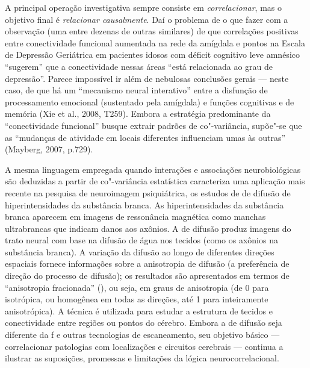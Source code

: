 A principal operação investigativa sempre consiste em
\emph{correlacionar}, mas o objetivo final é \emph{relacionar
causalmente}. Daí o problema de o que fazer com a observação (uma entre
dezenas de outras similares) de que correlações positivas entre
conectividade funcional aumentada na rede da amígdala e pontos na Escala
de Depressão Geriátrica em pacientes idosos com déficit cognitivo leve
amnésico ``sugerem'' que a conectividade nessas áreas ``está relacionada
ao grau de depressão''. Parece impossível ir além de nebulosas
conclusões gerais --- neste caso, de que há um ``mecanismo neural
interativo'' entre a disfunção de processamento emocional (sustentado
pela amígdala) e funções cognitivas e de memória (Xie et al., 2008,
T259). Embora a estratégia predominante da ``conectividade funcional''
busque extrair padrões de co"-variância, supõe"-se que as ``mudanças de
atividade em locais diferentes influenciam umas às outras'' (Mayberg,
2007, p.729).

A mesma linguagem empregada quando interações e associações
neurobiológicas são deduzidas a partir de co"-variância estatística
caracteriza uma aplicação mais recente na pesquisa de neuroimagem
psiquiátrica, os estudos de  de difusão de hiperintensidades da
substância branca. As hiperintensidades da substância branca aparecem em
imagens de ressonância magnética como manchas ultrabrancas que indicam
danos aos axônios. A  de difusão produz imagens do trato neural com
base na difusão de água nos tecidos (como os axônios na substância
branca). A variação da difusão ao longo de diferentes direções espaciais
fornece informações sobre a anisotropia de difusão (a preferência de
direção do processo de difusão); os resultados são apresentados em
termos de ``anisotropia fracionada'' (), ou seja, em graus de
anisotropia (de 0 para isotrópica, ou homogênea em todas as direções,
até 1 para inteiramente anisotrópica). A técnica é utilizada para
estudar a estrutura de tecidos e conectividade entre regiões ou pontos
do cérebro. Embora a  de difusão seja diferente da f e outras
tecnologias de escaneamento, seu objetivo básico --- correlacionar
patologias com localizações e circuitos cerebrais --- continua a
ilustrar as suposições, promessas e limitações da lógica
neurocorrelacional.

